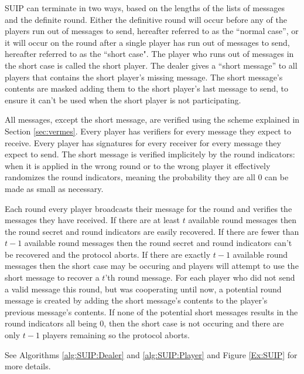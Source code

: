 \documentclass{dalcsthesis}
\begin{document}
SUIP can terminate in two ways, based on the lengths of the lists of messages and the definite round. Either the definitive round will occur before any of the players run out of messages to send, hereafter referred to as the ``normal case'', or it will occur on the round after a single player has run out of messages to send, hereafter referred to as the ``short case". The player who runs out of messages in the short case is called the short player. The dealer gives a ``short message'' to all players that contains the short player's missing message. The short message's contents are masked adding them to the short player's last message to send, to ensure it can't be used when the short player is not participating.

All messages, except the short message, are verified using the scheme explained in Section \ref{sec:vermes}. Every player has verifiers for every message they expect to receive. Every player has signatures for every receiver for every message they expect to send. The short message is verified implicitely by the round indicators: when it is applied in the wrong round or to the wrong player it effectively randomizes the round indicators, meaning the probability they are all 0 can be made as small as necessary.

Each round every player broadcasts their message for the round and verifies the messages they have received. If there are at least $t$ available round messages then the round secret and round indicators are easily recovered. If there are fewer than $t-1$ available round messages then the round secret and round indicators can't be recovered and the protocol aborts. If there are exactly $t-1$ available round messages then the short case may be occuring and players will attempt to use the short message to recover a $t$'th round message. For each player who did not send a valid message this round, but was cooperating until now, a potential round message is created by adding the short message's contents to the player's previous message's contents. If none of the potential short messages results in the round indicators all being 0, then the short case is not occuring and there are only $t-1$ players remaining so the protocol aborts.

See Algorithms \ref{alg:SUIP:Dealer} and \ref{alg:SUIP:Player} and Figure \ref{Ex:SUIP} for more details.
\end{document}
